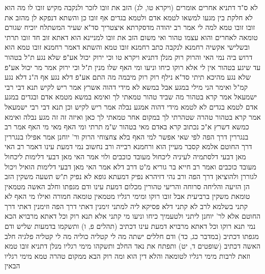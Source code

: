 \documentclass[12pt, openany]{book}
\begin{document}
{לא ס"ד דתניא אחרים אומרים  (ויקרא טו, לג) הזב את זובו לזכר ולנקבה מקיש זובו לו  מה הוא לא חלקת בין מגעו למשאו לטמא אדם ולטמא בגדים אף זובו כן 
והשתא דנפקא לן מהזב את זובו זובו טמא למה לי 
אמר רב יהודה מדסקרתא  איצטריך סד"א  שעיר המשתלח יוכיח שגורם טומאה לאחרים והוא עצמו טהור ואי משום הזב את זובו למניינא הוא דאתא 
זוב חד זובו תרתי ובשלישי אקשיה רחמנא לנקבה 
כתב רחמנא זובו טמא  והשתא דאמר רחמנא זובו טמא הוא דרוש ביה נמי האי
והרוק רוק מנלן  דתניא  {ויקרא טו } וכי ירוק יכול אע"פ שלא נגע ת"ל בטהור עד שיגע בטהור 
אין לי אלא רוקו כיחו וניעו ומי האף שלו מנין  ת"ל וכי ירוק 
אמר מר  יכול אע"פ שלא נגע מהיכא תיתי 
סד"א  נילף רוק רוק מיבמה מה התם אע"פ דלא נגע אף ה"נ דלא נגע קמ"ל 
ואימר  הני מילי במגע אבל במשא לא מידי דהוה אשרץ  אמר ריש לקיש תנא דבי רבי ישמעאל  אמר קרא בטהור מה שביד טהור טמאתי לך 
ואימא  במשא מטמא אדם ובגדים במגע אדם לטמא בגדים לא לטמא מידי דהוה אמגע נבלה 
אמר ריש לקיש וכן תנא דבי רבי ישמעאל  אמר קרא בטהור טהרה שטהרתי לך במקום אחר טמאתי לך כאן ואיזה זה זה מגע נבלה 
ואימא כמשא דשרץ  א"כ נכתוב קרא באדם מאי בטהור ש"מ תרתי
ומי האף מאי מי האף  אמר רב  בנגררין דרך הפה לפי שאי אפשר למי האף בלא צחצוחי הרוק  ור' יוחנן אמר  אפילו בנגררין דרך החוטם אלמא קסבר  מעיין הוא ורחמנא רבייה 
ורב נחשוב נמי דמעת עינו  דאמר רב  האי מאן דבעי דלסתמיה לעיניה ליכחול מעובד כוכבים  ולוי אמר  האי מאן דבעי דלימות ליכחול מעובד כוכבים 
ואמר רב חייא בר גוריא  מ"ט דרב דלא אמר האי מאן דבעי דלימות הואיל ויכול לגוררן ולהוציאן דרך הפה  ורב נהי דזיהרא נפיק דמעתא גופא לא נפיק 
ת"ש תשעה משקין הזב הן  הזיעה והליחה סרוחה והריעי טהורין מכלום  דמעת עינו ודם מגפתו וחלב האשה מטמאין טומאת משקין ברביעית  אבל זובו רוקו ומימי רגליו מטמאין טומאה חמורה  ואילו מי האף לא קתני 
בשלמא לרב לא קתני דלא פסיקא ליה למתני זימנין דאתי דרך הפה וזימנין דאתי דרך החוטם  אלא לר' יוחנן ליתני 
ולטעמיך כיחו וניעו מי קתני  אלא  תנא רוק וכל דאתא מרבויא הכא נמי תנא רוקו וכל דאתא מרבויא 
דמעת עינו דכתיב (תהלים פ, ו) ותשקמו בדמעות שליש  ודם מגפתו דכתיב (במדבר כג, כד) ודם חללים ישתה מה לי קטליה כוליה מה לי קטליה פלגיה  חלב האשה דכתיב (שופטים ד, יט) ותפתח את נאד החלב ותשקהו 
מימי רגליו מנלן  דתניא  זובו טמא וזאת לרבות מימי רגליו לטומאה  והלא דין הוא ומה רוק הבא ממקום טהרה טמא מימי רגליו הבאין}
\end{document}
